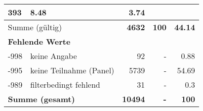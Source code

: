 \begin{longtable}{lXrrr}
       \num{393} &
       \num[round-mode=places,round-precision=2]{8,48} &
         \num[round-mode=places,round-precision=2]{3,74} \\
     \midrule
     \multicolumn{2}{l}{Summe (gültig)} &
       \textbf{\num{4632}} &
     \textbf{100} &
       \textbf{\num[round-mode=places,round-precision=2]{44,14}} \\
     \multicolumn{5}{l}{\textbf{Fehlende Werte}}\\
       -998 &
       keine Angabe &
         \num{92} &
        - &
         \num[round-mode=places,round-precision=2]{0,88} \\
       -995 &
       keine Teilnahme (Panel) &
         \num{5739} &
        - &
         \num[round-mode=places,round-precision=2]{54,69} \\
       -989 &
       filterbedingt fehlend &
         \num{31} &
        - &
         \num[round-mode=places,round-precision=2]{0,3} \\
     \midrule
     \multicolumn{2}{l}{\textbf{Summe (gesamt)}} &
          \textbf{\num{10494}} &
        \textbf{-} &
        \textbf{100} \\
     \bottomrule
     \end{longtable}
     
